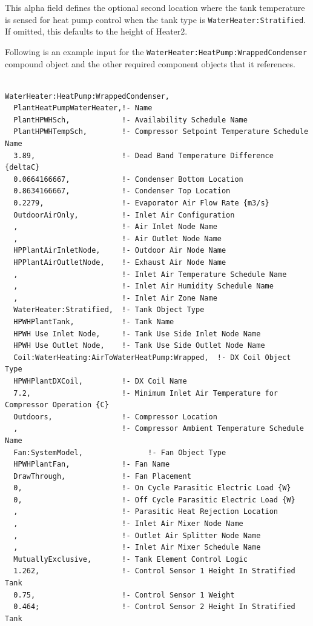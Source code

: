 This alpha field defines the optional second location where the tank temperature is sensed for heat pump control when the tank type is \lstinline!WaterHeater:Stratified!. If omitted, this defaults to the height of Heater2.

Following is an example input for the \lstinline!WaterHeater:HeatPump:WrappedCondenser! compound object and the other required component objects that it references.

\begin{lstlisting}

WaterHeater:HeatPump:WrappedCondenser,
  PlantHeatPumpWaterHeater,!- Name
  PlantHPWHSch,            !- Availability Schedule Name
  PlantHPWHTempSch,        !- Compressor Setpoint Temperature Schedule Name
  3.89,                    !- Dead Band Temperature Difference {deltaC}
  0.0664166667,            !- Condenser Bottom Location
  0.8634166667,            !- Condenser Top Location
  0.2279,                  !- Evaporator Air Flow Rate {m3/s}
  OutdoorAirOnly,          !- Inlet Air Configuration
  ,                        !- Air Inlet Node Name
  ,                        !- Air Outlet Node Name
  HPPlantAirInletNode,     !- Outdoor Air Node Name
  HPPlantAirOutletNode,    !- Exhaust Air Node Name
  ,                        !- Inlet Air Temperature Schedule Name
  ,                        !- Inlet Air Humidity Schedule Name
  ,                        !- Inlet Air Zone Name
  WaterHeater:Stratified,  !- Tank Object Type
  HPWHPlantTank,           !- Tank Name
  HPWH Use Inlet Node,     !- Tank Use Side Inlet Node Name
  HPWH Use Outlet Node,    !- Tank Use Side Outlet Node Name
  Coil:WaterHeating:AirToWaterHeatPump:Wrapped,  !- DX Coil Object Type
  HPWHPlantDXCoil,         !- DX Coil Name
  7.2,                     !- Minimum Inlet Air Temperature for Compressor Operation {C}
  Outdoors,                !- Compressor Location
  ,                        !- Compressor Ambient Temperature Schedule Name
  Fan:SystemModel,               !- Fan Object Type
  HPWHPlantFan,            !- Fan Name
  DrawThrough,             !- Fan Placement
  0,                       !- On Cycle Parasitic Electric Load {W}
  0,                       !- Off Cycle Parasitic Electric Load {W}
  ,                        !- Parasitic Heat Rejection Location
  ,                        !- Inlet Air Mixer Node Name
  ,                        !- Outlet Air Splitter Node Name
  ,                        !- Inlet Air Mixer Schedule Name
  MutuallyExclusive,       !- Tank Element Control Logic
  1.262,                   !- Control Sensor 1 Height In Stratified Tank
  0.75,                    !- Control Sensor 1 Weight
  0.464;                   !- Control Sensor 2 Height In Stratified Tank
\end{lstlisting}

